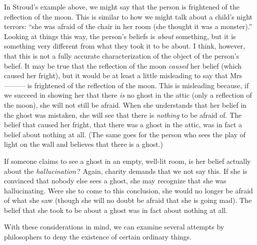 \documentclass[11pt]{standalone}
\begin{document}
\begin{spacing}{1.5}
In Stroud's example above, we might say that the person is frightened
of the reflection of the moon.  This is similar to how we might talk
about a child's night terrors: ``she was afraid of the chair in her
room (she thought it was a monster).''  Looking at things this way, the
person's beliefs is {\em about} something, but it is something very
different from what they took it to be about.  I think, however, that
this is not a fully accurate characterization of the object of the
person's belief.  It may be true that the reflection of the moon {\em
  caused} her belief (which caused her fright), but it would be at
least a little misleading to say that Mrs --------- is frightened of
the reflection of the moon.  This is misleading because, if we succeed
in showing her that there {\em is} no ghost in the attic (only a
reflection of the moon), she will not still be afraid.  When she
understands that her belief in the ghost was mistaken, she will see
that there is {\em nothing} to be afraid of.  The belief that caused
her fright, that there was a ghost in the attic, was in fact a belief
about nothing at all.  (The same goes for the person who sees the play
of light on the wall and believes that there is a ghost.)

If someone claims to see a ghost in an empty, well-lit room, is her
belief actually about the {\em hallucination}\,?  Again, charity
demands that we not say this.  If she is convinced that nobody else
sees a ghost, she may recognize that she was hallucinating.  Were she
to come to this conclusion, she would no longer be afraid of what she
saw (though she will no doubt be afraid that she is going mad).  The
belief that she took to be about a ghost was in fact about nothing at
all.

With these considerations in mind, we can examine several attempts by
philosophers to deny the existence of certain ordinary things.

\ifstandalone
\end{spacing}


\fi
\end{document}
